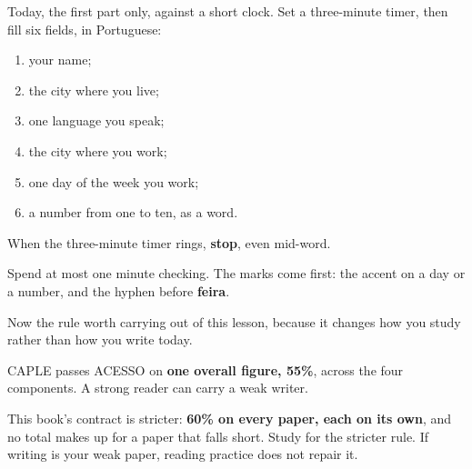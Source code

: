 Today, the first part only, against a short clock. Set a three-minute timer, then fill six fields, in Portuguese:

\begin{enumerate}
\raggedright
  \item your name;
  \item the city where you live;
  \item one language you speak;
  \item the city where you work;
  \item one day of the week you work;
  \item a number from one to ten, as a word.
\end{enumerate}

When the three-minute timer rings, \textbf{stop}, even mid-word.

\begin{tcolorbox}[breakable,colback=teal!4,colframe=teal!35!black,title={Before you move on}]
Spend at most one minute checking. The marks come first: the accent on a day or a number, and the hyphen before \textbf{feira}.

Now the rule worth carrying out of this lesson, because it changes how you study rather than how you write today.

CAPLE passes ACESSO on \textbf{one overall figure, 55\%}, across the four components. A strong reader can carry a weak writer.

This book's contract is stricter: \textbf{60\% on every paper, each on its own}, and no total makes up for a paper that falls short. Study for the stricter rule. If writing is your weak paper, reading practice does not repair it.
\end{tcolorbox}
